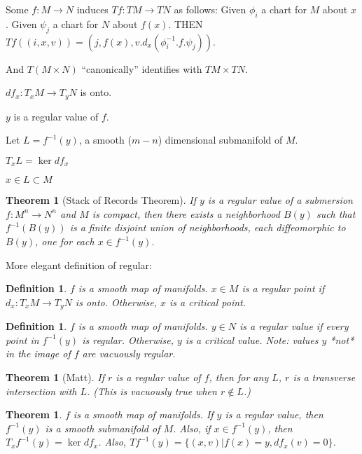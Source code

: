\documentclass[11pt]{amsbook}
\newenvironment{dateenv}{
	\vspace{1em}
}{
	\vspace{1em}
}
\newcommand{\mydate}[4]{
	\newdate{#1}{#2}{#3}{#4}
	\begin{dateenv}
		\hfill\displaydate{#1}
	\end{dateenv}
}
\theoremstyle{mystyle} \newtheorem{thrm}[thm]{Theorem}
\theoremstyle{mystyle} \newtheorem{defi}[thm]{Definition}
\theoremstyle{mystyle} \newtheorem{coro}[thm]{Corollary}
\theoremstyle{mystyle} \newtheorem{propo}[thm]{Proposition}
\theoremstyle{mystyle} \newtheorem{lemm}[thm]{Lemma}
\numberwithin{thm}{section}
\newcommand{\de}{\emph}
\begin{document}
Some $f: M \to N$ induces $Tf : TM \to TN$ as follows:
Given $\phi_i$ a chart for $M$ about $x$.
Given $\psi_j$ a chart for $N$ about $f(x)$.
THEN
$Tf((i, x, v)) = (j, f(x), v.d_x(\phi_i^{-1}.f.\psi_j))$.

And $T(M \times N)$ ``canonically'' identifies with $TM \times TN$.


\mydate{d2}{26}{9}{2016}



$df_x : T_xM \to T_yN$ is onto.

$y$ is a regular value of $f$.

Let $L = f^{-1}(y)$, a smooth ($m-n$) dimensional submanifold of $M$.

$T_xL = \ker df_x$

$x \in L \subset M$

\begin{thrm}[Stack of Records Theorem]
	If $y$ is a regular value of a submersion $f: M^n \to N^n$ and $M$ is compact, then there exists a neighborhood $B(y)$ such that $f^{-1}(B(y))$ is a finite disjoint union of neighborhoods, each diffeomorphic to $B(y)$, one for each $x \in f^{-1}(y)$.
\end{thrm}

\mydate{d3}{28}{9}{2016}

More elegant definition of regular:
\begin{defi}
	$f$ is a smooth map of manifolds.
	$x \in M$ is a \de{regular} point if $d_x : T_xM \to T_yN$ is onto.  Otherwise, $x$ is a \de{critical} point.
\end{defi}

\begin{defi}
	$f$ is a smooth map of manifolds.
	$y \in N$ is a \de{regular} value if every point in $f^{-1}(y)$ is regular.  Otherwise, $y$ is a \de{critical} value.  Note: values $y$ *not* in the image of $f$ are vacuously regular.
\end{defi}

\begin{thrm}[Matt]
	If $r$ is a regular value of $f$, then for any $L$, $r$ is a transverse intersection with $L$.  (This is vacuously true when $r \not\in L$.)
\end{thrm}

\begin{thrm}
	$f$ is a smooth map of manifolds.
	If $y$ is a regular value, then $f^{-1}(y)$ is a smooth submanifold of $M$.
	Also, if $x \in f^{-1}(y)$, then $T_xf^{-1}(y) = \ker df_x$.
	Also, $Tf^{-1}(y) = \{ (x,v) | f(x)=y, df_x(v) = 0\}$.
\end{thrm}
\end{document}
